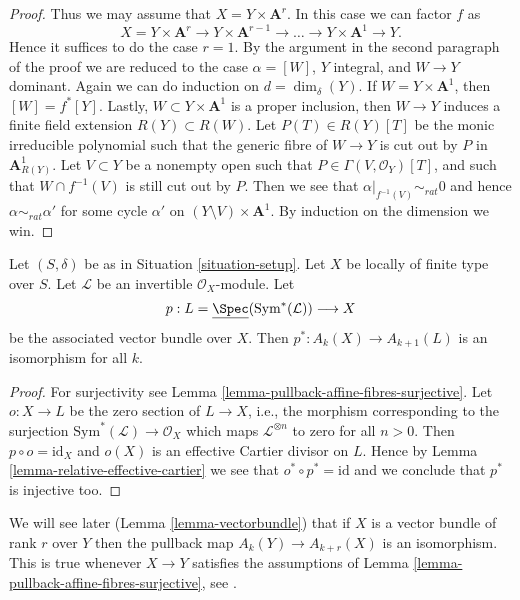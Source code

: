 \begin{proof}
\medskip\noindent
Thus we may assume that $X = Y \times \mathbf{A}^r$.
In this case we can factor $f$ as
$$
X = Y \times \mathbf{A}^r \to
Y \times \mathbf{A}^{r - 1} \to \ldots \to
Y \times \mathbf{A}^1 \to Y.
$$
Hence it suffices to do the case $r = 1$. By the argument in the
second paragraph of the proof we are reduced to the case
$\alpha = [W]$, $Y$ integral, and $W \to Y$ dominant.
Again we can do induction on $d = \dim_\delta(Y)$.
If $W = Y \times \mathbf{A}^1$, then $[W] = f^*[Y]$.
Lastly, $W \subset Y \times \mathbf{A}^1$ is a proper inclusion,
then $W \to Y$ induces a finite field extension $R(Y) \subset R(W)$.
Let $P(T) \in R(Y)[T]$ be the monic irreducible polynomial such
that the generic fibre of $W \to Y$ is cut out by $P$ in
$\mathbf{A}^1_{R(Y)}$. Let $V \subset Y$ be a nonempty open such
that $P \in \Gamma(V, \mathcal{O}_Y)[T]$, and such that
$W \cap f^{-1}(V)$ is still cut out by $P$. Then we see that
$\alpha|_{f^{-1}(V)} \sim_{rat} 0$ and hence $\alpha \sim_{rat} \alpha'$
for some cycle $\alpha'$ on $(Y \setminus V) \times \mathbf{A}^1$.
By induction on the dimension we win.
\end{proof}

\begin{lemma}
\label{lemma-linebundle}
Let $(S, \delta)$ be as in Situation \ref{situation-setup}.
Let $X$ be locally of finite type over $S$.
Let $\mathcal{L}$ be an invertible $\mathcal{O}_X$-module.
Let
$$
p :
L = \underline{\Spec}(\text{Sym}^*(\mathcal{L}))
\longrightarrow
X
$$
be the associated vector bundle over $X$.
Then $p^* : A_k(X) \to A_{k + 1}(L)$ is an isomorphism for all $k$.
\end{lemma}

\begin{proof}
For surjectivity see Lemma \ref{lemma-pullback-affine-fibres-surjective}.
Let $o : X \to L$ be the zero section of $L \to X$, i.e., the morphism
corresponding to the surjection $\text{Sym}^*(\mathcal{L}) \to \mathcal{O}_X$
which maps $\mathcal{L}^{\otimes n}$ to zero for all $n > 0$.
Then $p \circ o = \text{id}_X$ and $o(X)$ is an effective
Cartier divisor on $L$. Hence by Lemma \ref{lemma-relative-effective-cartier}
we see that $o^* \circ p^* = \text{id}$ and we conclude that $p^*$ is
injective too.
\end{proof}

\begin{remark}
\label{remark-when-isomorphism}
We will see later (Lemma \ref{lemma-vectorbundle}) that if $X$ is a
vector bundle of rank $r$ over $Y$ then the pullback map
$A_k(Y) \to A_{k + r}(X)$
is an isomorphism. This is true whenever $X \to Y$ satisfies
the assumptions of Lemma \ref{lemma-pullback-affine-fibres-surjective}, see
\cite[Lemma 2.2]{Totaro-group}.
\end{remark}

